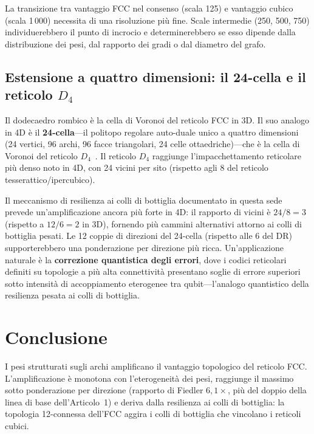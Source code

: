 \documentclass[11pt]{article}
\begin{document}
La transizione tra vantaggio FCC nel consenso (scala 125) e vantaggio
cubico (scala 1\,000) necessita di una risoluzione pi\`u fine. Scale
intermedie (250, 500, 750) individuerebbero il punto di incrocio e
determinerebbero se esso dipende dalla distribuzione dei pesi, dal
rapporto dei gradi o dal diametro del grafo.

\subsection{Estensione a quattro dimensioni: il 24-cella e il reticolo $D_4$}

Il dodecaedro rombico \`e la cella di Voronoi del reticolo FCC in 3D.
Il suo analogo in 4D \`e il \textbf{24-cella}---il politopo regolare
auto-duale unico a quattro dimensioni (24 vertici, 96 archi, 96 facce
triangolari, 24 celle ottaedriche)---che \`e la cella di Voronoi del
reticolo $D_4$~\cite{conway1999, coxeter1973}. Il reticolo $D_4$
raggiunge l'impacchettamento reticolare pi\`u denso noto in 4D, con 24
vicini per sito (rispetto agli 8 del reticolo tesserattico/ipercubico).

Il meccanismo di resilienza ai colli di bottiglia documentato in questa
sede prevede un'amplificazione ancora pi\`u forte in 4D: il rapporto
di vicini \`e $24/8 = 3$ (rispetto a $12/6 = 2$ in 3D), fornendo
pi\`u cammini alternativi attorno ai colli di bottiglia pesati. Le 12
coppie di direzioni del 24-cella (rispetto alle 6 del DR)
supporterebbero una ponderazione per direzione pi\`u ricca.
Un'applicazione naturale \`e la \textbf{correzione quantistica degli
errori}, dove i codici reticolari definiti su topologie a pi\`u alta
connettivit\`a presentano soglie di errore superiori sotto intensit\`a
di accoppiamento eterogenee tra qubit---l'analogo quantistico della
resilienza pesata ai colli di bottiglia.

\section{Conclusione}
\label{sec:conclusion}

I pesi strutturati sugli archi amplificano il vantaggio topologico del
reticolo FCC. L'amplificazione \`e monotona con l'eterogeneit\`a dei
pesi, raggiunge il massimo sotto ponderazione per direzione (rapporto
di Fiedler $6{,}1\times$, pi\`u del doppio della linea di base
dell'Articolo~1) e deriva dalla resilienza ai colli di bottiglia: la
topologia 12-connessa dell'FCC aggira i colli di bottiglia che
vincolano i reticoli cubici.
\end{document}
